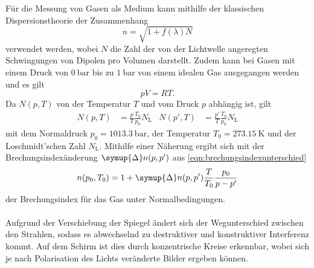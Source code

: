     Für die Messung von Gasen als Medium kann mithilfe der klassischen Dispersionstheorie der Zusammenhang
    \begin{equation*}
        n = \sqrt{1 + f(\lambda)N}
    \end{equation*}
    verwendet werden,
    wobei $N$ die Zahl der von der Lichtwelle angeregten Schwingungen von Dipolen pro Volumen darstellt.
    Zudem kann bei Gasen mit einem Druck von $\SI{0}{\bar}$ bis zu $\SI{1}{\bar}$ von einem idealen Gas ausgegangen werden und es gilt
    \begin{equation*}
        p V = R T .
    \end{equation*}
    Da $N(p,T)$ von der Temperatur $T$ und vom Druck $p$ abhängig ist,
    gilt
    \begin{align*}
        N(p,T) &= \frac{p}{T} \frac{T_0}{p_0} N_\text{L} & N(p',T) &= \frac{p'}{T} \frac{T_0}{p_0} N_\text{L}
    \end{align*}
    mit dem Normaldruck $p_0 = \SI{1013.3}{\bar}$,
    der Temperatur $T_0 = \SI{273.15}{\kelvin}$
    und der Loschmidt'schen Zahl $N_\text{L}$.
    Mithilfe einer Näherung ergibt sich mit der Brechungsindexänderung $\symup{\Delta}n(p,p')$ aus \autoref{eqn:brechungsindexunterschied}
    \begin{equation}
        \label{eqn:brechungsindex}
        n(p_0,T_0) = 1 + \symup{\Delta}n(p,p') \frac{T}{T_0} \frac{p_0}{p - p'}
    \end{equation}
    der Brechungsindex für das Gas unter Normalbedingungen.\\
    \\
    Aufgrund der Verschiebung der Spiegel  %
    ändert sich der Wegunterschied zwischen den Strahlen,
    sodass es abwechselnd zu destruktiver und konstruktiver Interferenz kommt.
    Auf dem Schirm ist dies durch konzentrische Kreise erkennbar,
    wobei sich je nach Polarisation des Lichts veränderte Bilder ergeben können.
